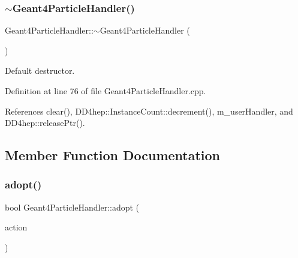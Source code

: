 \hypertarget{class_d_d4hep_1_1_simulation_1_1_geant4_particle_handler_a38b97e54b48b0df16a7205a683a68180}{}\label{class_d_d4hep_1_1_simulation_1_1_geant4_particle_handler_a38b97e54b48b0df16a7205a683a68180} 
\subsubsection{\texorpdfstring{$\sim$\+Geant4\+Particle\+Handler()}{~Geant4ParticleHandler()}}
{\footnotesize\ttfamily Geant4\+Particle\+Handler\+::$\sim$\+Geant4\+Particle\+Handler (\begin{DoxyParamCaption}{ }\end{DoxyParamCaption})\hspace{0.3cm}{\ttfamily [virtual]}}



Default destructor. 



Definition at line 76 of file Geant4\+Particle\+Handler.\+cpp.



References clear(), D\+D4hep\+::\+Instance\+Count\+::decrement(), m\+\_\+user\+Handler, and D\+D4hep\+::release\+Ptr().



\subsection{Member Function Documentation}
\hypertarget{class_d_d4hep_1_1_simulation_1_1_geant4_particle_handler_a2f69aadfffab73e1fb98f5cd3a1e3ebb}{}\label{class_d_d4hep_1_1_simulation_1_1_geant4_particle_handler_a2f69aadfffab73e1fb98f5cd3a1e3ebb} 
\subsubsection{\texorpdfstring{adopt()}{adopt()}}
{\footnotesize\ttfamily bool Geant4\+Particle\+Handler\+::adopt (\begin{DoxyParamCaption}\item[{\hyperlink{class_d_d4hep_1_1_simulation_1_1_geant4_action}{Geant4\+Action} $\ast$}]{action }\end{DoxyParamCaption})}



